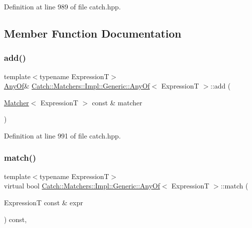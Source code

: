 Definition at line 989 of file catch.\+hpp.



\subsection{Member Function Documentation}
\hypertarget{class_catch_1_1_matchers_1_1_impl_1_1_generic_1_1_any_of_a3bce94b627551e5f96c5f9c6060413f0}{}\label{class_catch_1_1_matchers_1_1_impl_1_1_generic_1_1_any_of_a3bce94b627551e5f96c5f9c6060413f0} 
\subsubsection{\texorpdfstring{add()}{add()}}
{\footnotesize\ttfamily template$<$typename ExpressionT$>$ \\
\hyperlink{class_catch_1_1_matchers_1_1_impl_1_1_generic_1_1_any_of}{Any\+Of}\& \hyperlink{class_catch_1_1_matchers_1_1_impl_1_1_generic_1_1_any_of}{Catch\+::\+Matchers\+::\+Impl\+::\+Generic\+::\+Any\+Of}$<$ ExpressionT $>$\+::add (\begin{DoxyParamCaption}\item[{\hyperlink{struct_catch_1_1_matchers_1_1_impl_1_1_matcher}{Matcher}$<$ ExpressionT $>$ const \&}]{matcher }\end{DoxyParamCaption})\hspace{0.3cm}{\ttfamily [inline]}}



Definition at line 991 of file catch.\+hpp.

\hypertarget{class_catch_1_1_matchers_1_1_impl_1_1_generic_1_1_any_of_adebd5437cdb8e0d54e16e97fe26e7e85}{}\label{class_catch_1_1_matchers_1_1_impl_1_1_generic_1_1_any_of_adebd5437cdb8e0d54e16e97fe26e7e85} 
\subsubsection{\texorpdfstring{match()}{match()}}
{\footnotesize\ttfamily template$<$typename ExpressionT$>$ \\
virtual bool \hyperlink{class_catch_1_1_matchers_1_1_impl_1_1_generic_1_1_any_of}{Catch\+::\+Matchers\+::\+Impl\+::\+Generic\+::\+Any\+Of}$<$ ExpressionT $>$\+::match (\begin{DoxyParamCaption}\item[{ExpressionT const \&}]{expr }\end{DoxyParamCaption}) const\hspace{0.3cm}{\ttfamily [inline]}, {\ttfamily [virtual]}}



